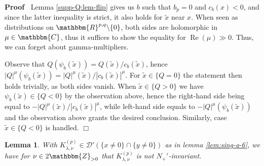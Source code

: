 \documentclass{article}
\newcommand{\nocomma}{}
\newcommand{\tmop}[1]{\ensuremath{\operatorname{#1}}}
\newenvironment{proof}{\noindent\textbf{Proof\ }}{\hspace*{\fill}$\Box$\medskip}
\numberwithin{definition}{section}
\newtheorem{lemma}{Lemma}
\numberwithin{lemma}{section}
\numberwithin{proposition}{section}
{\theorembodyfont{\rmfamily}\newtheorem{remark}{Remark}
\numberwithin{remark}{section}
}
\begin{document}
\begin{proof}
  Lemma \ref{supp-Q:lem-flip} gives us $b$ such that $b_p = 0$ and $c_b ( x) <
  0$, and since the latter inequality is strict, it also holds for $\tilde{x}$
  near $x$. When seen as distributions on $\mathbbm{R}^{p, q} \backslash \{ 0
  \}$, both sides are holomorphic in $\mu \in \mathbbm{C}$, thus it suffices
  to show the equality for $\tmop{Re} ( \mu) \gg 0$. Thus, we can forget about
  gamma-multipliers.
  
  Observe that $Q ( \psi_b ( \tilde{x})) = Q ( \tilde{x}) / c_b ( \tilde{x})
  \nocomma$, hence $| Q |^{\mu} ( \psi_b ( \tilde{x})) = | Q |^{\mu} (
  \tilde{x}) / | c_b ( \tilde{x}) |^{\mu} \nocomma$. For $\tilde{x} \in \{ Q =
  0 \}$ the statement then holds trivially, as both sides vanish. When
  $\tilde{x} \in \{ Q > 0 \}$ we have $\psi_b ( \tilde{x}) \in \{ Q < 0 \}$ by
  the observation above, hence the right-hand side being equal to $- | Q
  |_{}^{\mu} ( \tilde{x}) / | c_b ( \tilde{x}) |^{\mu}$, while left-hand side
  equals to $- | Q |^{\mu} ( \psi_b ( \tilde{x}))$ and the observation above
  grants the desired conclusion. Similarly, case $\tilde{x} \in \{ Q < 0 \}$
  is handled.
\end{proof}

\begin{lemma}
  \label{lem:sing-q-7}With $K_{\lambda, \nu}^{( p)} \in \mathcal{D}' ( \{ x
  \neq 0 \} \cap \{ y \neq 0 \})$ as in lemma \ref{lem:sing-q-6}, we have for
  $\nu \in 2\mathbbm{Z}_{> 0}$ that $K_{\lambda, \nu}^{( p)}$ is not
  $N_+'$-invariant.
\end{lemma}
\end{document}
